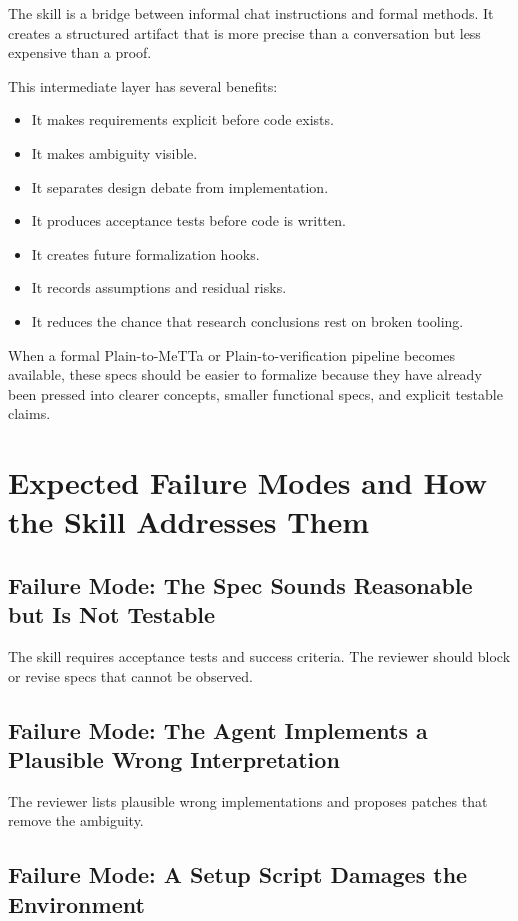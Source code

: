 \documentclass[11pt]{article}
\begin{document}
The skill is a bridge between informal chat instructions and formal methods. It
creates a structured artifact that is more precise than a conversation but less
expensive than a proof.

This intermediate layer has several benefits:

\begin{itemize}[nosep]
\item It makes requirements explicit before code exists.
\item It makes ambiguity visible.
\item It separates design debate from implementation.
\item It produces acceptance tests before code is written.
\item It creates future formalization hooks.
\item It records assumptions and residual risks.
\item It reduces the chance that research conclusions rest on broken tooling.
\end{itemize}

When a formal Plain-to-MeTTa or Plain-to-verification pipeline becomes available,
these specs should be easier to formalize because they have already been pressed
into clearer concepts, smaller functional specs, and explicit testable claims.

\section{Expected Failure Modes and How the Skill Addresses Them}

\subsection{Failure Mode: The Spec Sounds Reasonable but Is Not Testable}

The skill requires acceptance tests and success criteria. The reviewer should
block or revise specs that cannot be observed.

\subsection{Failure Mode: The Agent Implements a Plausible Wrong Interpretation}

The reviewer lists plausible wrong implementations and proposes patches that
remove the ambiguity.

\subsection{Failure Mode: A Setup Script Damages the Environment}
\end{document}
